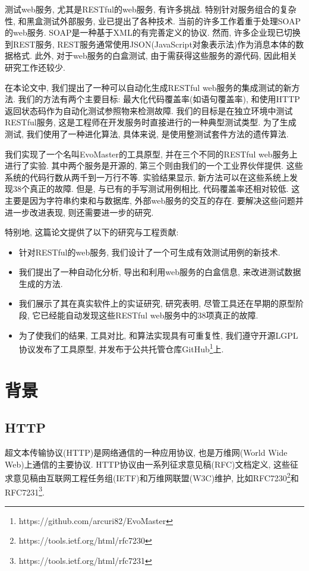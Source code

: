 测试web服务, 尤其是RESTful的web服务, 有许多挑战. 特别针对服务组合的复杂性, 和黑盒测试外部服务, 业已提出了各种技术. 当前的许多工作着重于处理SOAP的web服务. SOAP是一种基于XML的有完善定义的协议. 然而, 许多企业现已切换到REST服务, REST服务通常使用JSON(JavaScript对象表示法)作为消息本体的数据格式. 此外, 对于web服务的白盒测试, 由于需获得这些服务的源代码, 因此相关研究工作还较少. 

在本论文中, 我们提出了一种可以自动化生成RESTful web服务的集成测试的新方法. 我们的方法有两个主要目标: 最大化代码覆盖率(如语句覆盖率), 和使用HTTP返回状态码作为自动化测试参照物来检测故障. 我们的目标是在独立环境中测试RESTful服务, 这是工程师在开发服务时直接进行的一种典型测试类型. 为了生成测试, 我们使用了一种进化算法, 具体来说, 是使用整测试套件方法的遗传算法. 

我们实现了一个名叫EvoMaster的工具原型, 并在三个不同的RESTful web服务上进行了实验. 其中两个服务是开源的, 第三个则由我们的一个工业界伙伴提供. 这些系统的代码行数从两千到一万行不等. 实验结果显示, 新方法可以在这些系统上发现38个真正的故障. 但是, 与已有的手写测试用例相比, 代码覆盖率还相对较低. 这主要是因为字符串约束和与数据库, 外部web服务的交互的存在. 要解决这些问题并进一步改进表现, 则还需要进一步的研究.

特别地, 这篇论文提供了以下的研究与工程贡献: 

\begin{itemize}
\item 针对RESTful的web服务, 我们设计了一个可生成有效测试用例的新技术.
\item 我们提出了一种自动化分析, 导出和利用web服务的白盒信息, 来改进测试数据生成的方法.
\item 我们展示了其在真实软件上的实证研究, 研究表明, 尽管工具还在早期的原型阶段, 它已经能自动发现这些RESTful web服务中的38项真正的故障.
\item 为了使我们的结果, 工具对比, 和算法实现具有可重复性, 我们遵守开源LGPL协议发布了工具原型, 并发布于公共托管仓库GitHub\footnote{https://github.com/arcuri82/EvoMaster}上.
\end{itemize}
  
\section{背景}
  \subsection{HTTP}
      超文本传输协议(HTTP)是网络通信的一种应用协议, 也是万维网(World Wide Web)上通信的主要协议. HTTP协议由一系列征求意见稿(RFC)文档定义, 这些征求意见稿由互联网工程任务组(IETF)和万维网联盟(W3C)维护, 比如RFC7230\footnote{https://tools.ietf.org/html/rfc7230}和RFC7231\footnote{https://tools.ietf.org/html/rfc7231}. 
        
